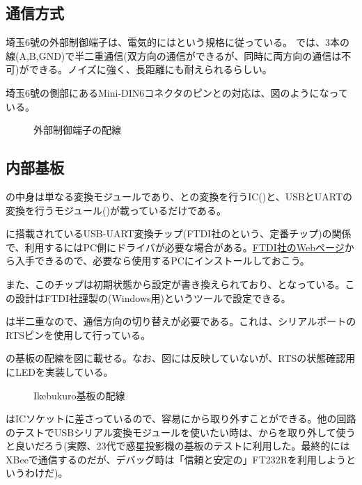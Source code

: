 \documentclass[letterpaper,10pt,dvipdfmx]{sphinxmanual}
\begin{document}
\subsection{通信方式}
\label{\detokenize{nissyu-idohen/ikebukuro:id5}}
埼玉6號の外部制御端子は、電気的にはという規格に従っている。
では、3本の線(A,B,GND)で半二重通信(双方向の通信ができるが、同時に両方向の通信は不可)ができる。ノイズに強く、長距離にも耐えられるらしい。

埼玉6號の側部にあるMini-DIN6コネクタのピンとの対応は、図のようになっている。
\begin{figure}[htbp]
\centering
\capstart

\noindent{}
\caption{外部制御端子の配線}\label{\detokenize{nissyu-idohen/ikebukuro:id13}}\end{figure}


\subsection{内部基板}
\label{\detokenize{nissyu-idohen/ikebukuro:id6}}
の中身は単なる変換モジュールであり、との変換を行うIC()と、USBとUARTの変換を行うモジュール()が載っているだけである。

に搭載されているUSB-UART変換チップ(FTDI社のという、定番チップ)の関係で、利用するにはPC側にドライバが必要な場合がある。\href{http://www.ftdichip.com/Drivers/VCP.htm}{FTDI社のWebページ}から入手できるので、必要なら使用するPCにインストールしておこう。

また、このチップは初期状態から設定が書き換えられており、となっている。この設計はFTDI社謹製の(Windows用)というツールで設定できる。

は半二重なので、通信方向の切り替えが必要である。これは、シリアルポートのRTSピンを使用して行っている。

の基板の配線を図に載せる。なお、図には反映していないが、RTSの状態確認用にLEDを実装している。
\begin{figure}[htbp]
\centering
\capstart

\noindent{}
\caption{Ikebukuro基板の配線}\label{\detokenize{nissyu-idohen/ikebukuro:id14}}\end{figure}

はICソケットに差さっているので、容易にから取り外すことができる。他の回路のテストでUSBシリアル変換モジュールを使いたい時は、からを取り外して使うと良いだろう(実際、23代で惑星投影機の基板のテストに利用した。最終的にはXBeeで通信するのだが、デバッグ時は「信頼と安定の」FT232Rを利用しようというわけだ)。
\end{document}
